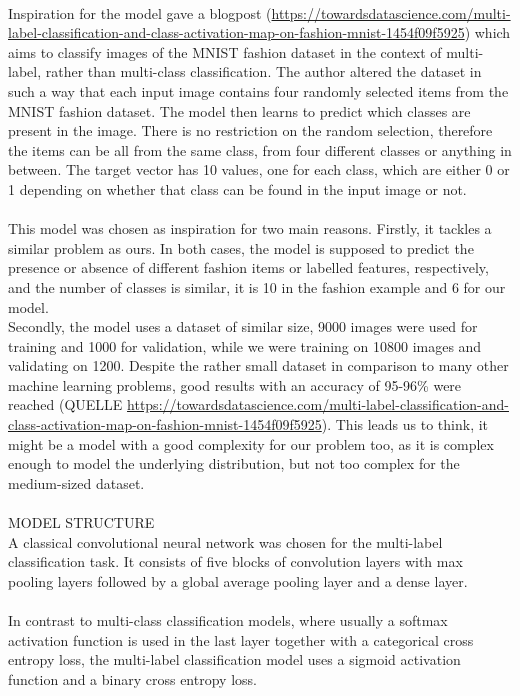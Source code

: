 \\
Inspiration for the model gave a blogpost (\url{https://towardsdatascience.com/multi-label-classification-and-class-activation-map-on-fashion-mnist-1454f09f5925}) which aims to classify images of the MNIST fashion dataset in the context of multi-label, rather than multi-class classification. The author altered the dataset in such a way that each input image contains four randomly selected items from the MNIST fashion dataset. The model then learns to predict which classes are present in the image. There is no restriction on the random selection, therefore the items can be all from the same class, from four different classes or anything in between. The target vector has 10 values, one for each class, which are either 0 or 1 depending on whether that class can be found in the input image or not. \\
\\
This model was chosen as inspiration for two main reasons. Firstly, it tackles a similar problem as ours. In both cases, the model is supposed to predict the presence or absence of different fashion items or labelled features, respectively, and the number of classes is similar, it is 10 in the fashion example and 6 for our model. \\
Secondly, the model uses a dataset of similar size, 9000 images were used for training and 1000 for validation, while we were training on 10800 images and validating on 1200. Despite the rather small dataset in comparison to many other machine learning problems, good results with an accuracy of 95-96\% were reached (QUELLE \url{https://towardsdatascience.com/multi-label-classification-and-class-activation-map-on-fashion-mnist-1454f09f5925}). This leads us to think, it might be a model with a good complexity for our problem too, as it is complex enough to model the underlying distribution, but not too complex for the medium-sized dataset.
 \\
\\
MODEL STRUCTURE \\
A classical convolutional neural network was chosen for the multi-label classification task. It consists of five blocks of convolution layers with max pooling layers followed by a global average pooling layer and a dense layer. \\
\\
In contrast to multi-class classification models, where usually a softmax activation function is used in the last layer together with a categorical cross entropy loss, the multi-label classification model uses a sigmoid activation function and a binary cross entropy loss. \\
